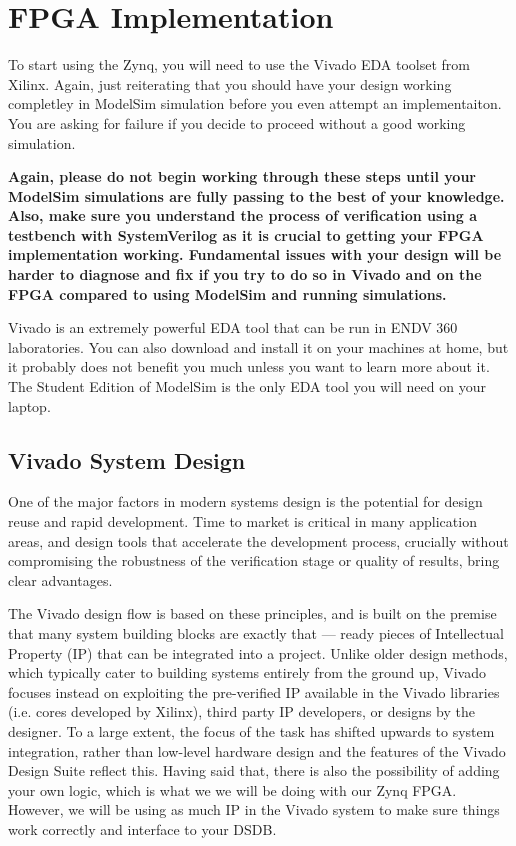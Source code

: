 \documentclass{article}
\begin{document}
\section{FPGA Implementation}

To start using the Zynq, you will need to use the Vivado EDA toolset
from Xilinx.  Again, just reiterating that you should have your design
working completley in ModelSim simulation before you even attempt an
implementaiton.  You are asking for failure if you decide to proceed
without a good working simulation.

\textbf{Again, please do not begin working through these steps until
  your ModelSim  
  simulations are fully passing to the best of your knowledge.
  Also, make sure you understand the process of verification using a
  testbench with SystemVerilog as it is crucial to getting your FPGA
  implementation working.  Fundamental issues
  with your design will be harder to diagnose and fix if you try to do so in
  Vivado and on the FPGA compared to using ModelSim and running
  simulations.}

Vivado is an extremely powerful EDA tool that can be run in ENDV 360
laboratories.  You can also download and install it on your machines
at home, but it probably does not benefit you much unless you want to
learn more about it.  The Student Edition of ModelSim is the only EDA
tool you will need on your laptop.

\subsection{Vivado System Design}

One of the major factors in modern systems design is the potential for design reuse and
rapid development. Time to market is critical in many application areas, and design tools
that accelerate the development process, crucially without compromising the robustness of
the verification stage or quality of results, bring clear advantages.

The Vivado design flow is based on these principles, and is built on the premise that
many system building blocks are exactly that — ready pieces of
Intellectual Property (IP) that can be integrated
into a project. Unlike older design methods, which typically cater to building systems
entirely from the ground up, Vivado focuses instead on exploiting the pre-verified IP
available in the Vivado libraries (i.e. cores developed by Xilinx), third party IP developers,
or designs by the designer. To a large extent, the focus
of the task has shifted upwards to system integration, rather than low-level hardware
design and the features of the Vivado Design Suite reflect this. Having said that, there is
also the possibility of adding your own logic, which is what we we
will be doing with our Zynq FPGA.  However, we will be using as much
IP in the Vivado system to make sure things work correctly and
interface to your DSDB.
\end{document}
